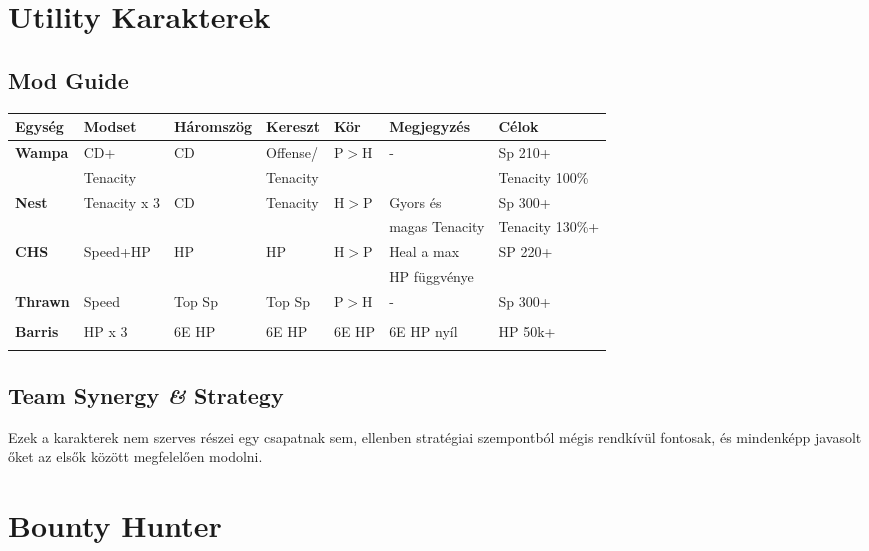 \documentclass[11pt]{report}
\begin{document}
\chapter{Utility Karakterek}
\section{Mod Guide}
\begin{center}
    \begin{tabular}{|l | l | l | l | l | l | l |}
        \hline
        Egység & Modset & Háromszög & Kereszt & Kör & Megjegyzés & Célok\\ \hline
        \textbf{Wampa} & CD+ & CD & Offense/ & P$>$H & - & Sp 210+\\
        & Tenacity &  & Tenacity &  &  & Tenacity 100\%\\ \hline
        \textbf{Nest} & Tenacity x 3 & CD & Tenacity & H$>$P & Gyors és & Sp 300+\\
        &  &  &  &  & magas Tenacity & Tenacity 130\%+\\ \hline
        \textbf{CHS} & Speed+HP & HP & HP & H$>$P & Heal a max & SP 220+\\
        &  &  &  &  & HP függvénye & \\ \hline
        \textbf{Thrawn} & Speed & Top Sp & Top Sp & P$>$H & - & Sp 300+\\
        &  &  &  &  &  & \\ \hline
        \textbf{Barris} & HP x 3 & 6E HP & 6E HP & 6E HP & 6E HP nyíl & HP 50k+\\
        &  &  &  &  &  & \\ \hline
    \end{tabular}
\end{center}
\section{Team Synergy \textit{\&} Strategy}
Ezek a karakterek nem szerves részei egy csapatnak sem, ellenben stratégiai szempontból mégis rendkívül fontosak, és mindenképp javasolt őket az elsők között megfelelően modolni.

\chapter{Bounty Hunter}
\end{document}
